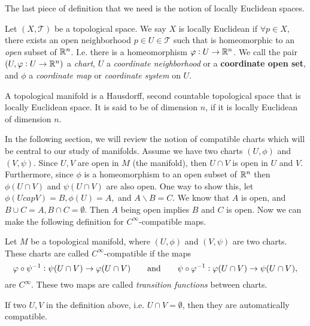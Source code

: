 The last piece of definition that we need is the notion of locally Euclidean spaces.

\begin{definition}
	Let $ (X,\mathcal{T}) $ be a topological space. We say $ X $ is locally Euclidean if $ \forall p \in X $, there exists an open neighborhood $ p \in U \in \mathcal{T}$ such that is homeomorphic to an \emph{open} subset of $ \mathbb{R}^n $. I.e. there is a homeomorphism $ \varphi: U \to \mathbb{R}^n $. We call the pair $ (U,\varphi:U\to\mathbb{R}^n) $ a \emph{chart}, $ U $ a \emph{coordinate neighborhood} or a \textbf{coordinate open set}, and $ \phi $ a \emph{coordinate map} or \emph{coordinate system} on $ U $. 
\end{definition}


\begin{definition}
	A topological manifold is a Hausdorff, second countable topological space that is locally Euclidean space. It is said to be of dimension $ n $, if it is locally Euclidean of dimension $ n $.
\end{definition}


In the following section, we will review the notion of compatible charts which will be central to our study of manifolds. Assume we have two charts $ (U,\phi) $ and $ (V,\psi) $. Since $  U,V $ are open in $ M $ (the manifold), then $ U\cap V $ is open in $ U $ and $ V $. Furthermore, since $ \phi $ is a homeomorphism to an open subset of $ \mathbb{R}^n $ then $ \phi(U\cap V) $ and $ \psi(U\cap V) $ are also open. One way to show this, let $ \phi(U cap V) = B, \phi(U) = A, $ and $ A\backslash B = C $. We know that $  A $ is open, and $ B\cup C = A, B \cap C = \emptyset $. Then $ A $ being open implies $ B $ and $ C $ is open. Now we can make the following definition for $ C^\infty $-compatible maps.

\begin{definition}
	Let $ M $ be a topological manifold, where $ (U,\phi) $ and $ (V,\psi) $ are two charts. These charts are called $ C^\infty $-compatible if the maps
	\[ \varphi\circ \psi^{-1} : \psi(U\cap V) \to \varphi(U\cap V)\qquad \text{and} \qquad  \psi \circ\varphi^{-1}: \varphi(U \cap V) \to \psi(U\cap V),  \]
	are $ C^\infty $. These two maps are called \emph{transition functions} between charts. 
\end{definition}

\begin{remark}
	If two $ U,V $ in the definition above, i.e. $ U\cap V = \emptyset $, then they are automatically compatible.
\end{remark}

